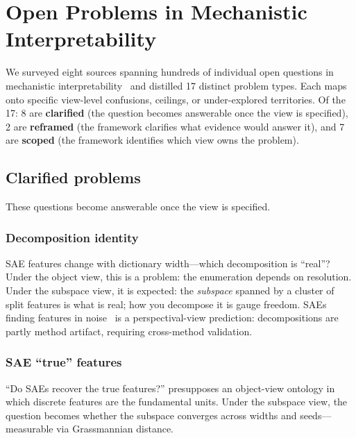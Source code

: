 \documentclass{article}
\begin{document}
\section{Open Problems in Mechanistic Interpretability}\label{app:openprobs}

We surveyed eight sources spanning hundreds of individual open questions
in mechanistic interpretability~\citep{sharkey2025,nanda2022open,
apollo2024,schmidt2026,steinhardt2026,williams2025,mib2025,orgad2026}
and distilled 17 distinct problem types.  Each maps onto specific
view-level confusions, ceilings, or under-explored territories.
Of the 17: 8 are \textbf{clarified} (the question becomes answerable once the
view is specified), 2 are \textbf{reframed} (the framework clarifies what
evidence would answer it), and 7 are \textbf{scoped} (the framework
identifies which view owns the problem).

\subsection{Clarified problems}

These questions become answerable once the view is specified.

\subsubsection{Decomposition identity}
SAE features change with dictionary width---which decomposition is
``real''?  Under the object view, this is a problem: the enumeration
depends on resolution.  Under the subspace view, it is expected: the
\emph{subspace} spanned by a cluster of split features is what is
real; how you decompose it is gauge freedom.  SAEs finding features
in noise~\citep{leask2025} is a perspectival-view prediction:
decompositions are partly method artifact, requiring cross-method
validation.

\subsubsection{SAE ``true'' features}
``Do SAEs recover the true features?'' presupposes an object-view
ontology in which discrete features are the fundamental units.  Under
the subspace view, the question becomes whether the subspace converges
across widths and seeds---measurable via Grassmannian distance.
\end{document}
